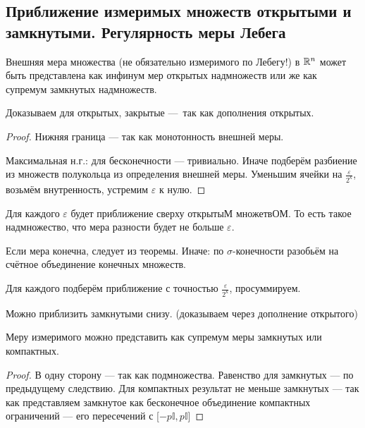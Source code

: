 \documentclass[12pt, a4paper, oneside]{memoir}
\begin{document}
\subsection{Приближение измеримых множеств открытыми и замкнутыми.
Регулярность меры Лебега}

\begin{theorem}
    Внешняя мера множества (не обязательно измеримого по Лебегу!) в ${\mathbb{R}}^n$ может быть представлена
    как инфинум мер открытых надмножеств
    или же как супремум замкнутых надмножеств.

    Доказываем для открытых, закрытые — так как дополнения открытых.

    \begin{proof}
        Нижняя граница — так как монотонность внешней меры.
        
        Максимальная н.г.: для бесконечности — тривиально.
        Иначе подберём разбиение из множеств полукольца из определения внешней меры.
        Уменьшим ячейки на $\frac{\varepsilon}{2^k}$, возьмём внутренность, устремим $\varepsilon$ к нулю.
    \end{proof}
\end{theorem}

\begin{corollary}
    Для каждого $\varepsilon$ будет приближение сверху открытыМ множетвОМ.
    То есть такое надмножество, что мера разности будет не больше $\varepsilon$.

    Если мера конечна, следует из теоремы. Иначе: по $\sigma$-конечности разобьём на счётное объединение конечных множеств.

    Для каждого подберём приближение с точностью $\frac{\varepsilon}{2^k}$, просуммируем.
\end{corollary}



\begin{corollary}
    Можно приблизить замкнутыми снизу. (доказываем через дополнение открытого)
\end{corollary}

\begin{corollary}
    Меру измеримого можно представить как супремум меры замкнутых или компактных.

    \begin{proof}
        В одну сторону — так как подмножества. Равенство для замкнутых — по предыдущему следствию.
        Для компактных результат не меньше замкнутых —
        так как представляем замкнутое как бесконечное объединение компактных ограничений
        — его пересечений с [$-p \mathbb{I}, p \mathbb{I}$]
    \end{proof}
\end{corollary}
\end{document}
